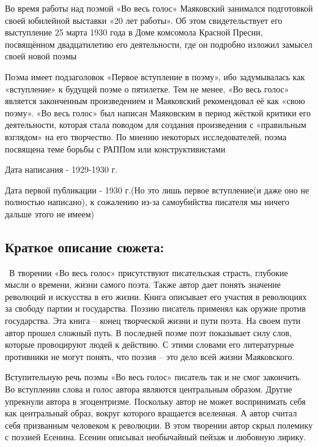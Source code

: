 \documentclass[a4paper,12pt]{article}
\begin{document}
	\noindent
	Во время работы над поэмой «Во весь голос» Маяковский занимался подготовкой своей юбилейной выставки «20 лет работы». Об этом свидетельствует его выступление 25 марта 1930 года в Доме комсомола Красной Пресни, посвящённом двадцатилетию его деятельности, где он подробно изложил замысел своей новой поэмы
	
	
	\noindent
	Поэма имеет подзаголовок «Первое вступление в поэму», ибо задумывалась как «вступление» к будущей поэме о пятилетке. Тем не менее, «Во весь голос» является законченным произведением и Маяковский рекомендовал её как «свою поэму». «Во весь голос» был написан Маяковским в период жёсткой критики его деятельности, которая стала поводом для создания произведения с «правильным взглядом» на его творчество. По мнению некоторых исследователей, поэма посвящена теме борьбы с РАППом или конструктивистами
	
	\noindent
	Дата написания - 1929-1930 г.
	
	\noindent
	Дата первой публикации - 1930 г.(Но это лишь первое вступление(и даже оно не полностью написано), к сожалению из-за самоубийства писателя мы ничего дальше этого не имеем)
	
	\subsection{Краткое описание сюжета: }
	\quad \, В творении «Во весь голос» присутствуют писательская страсть, глубокие мысли о времени, жизни самого поэта. Также автор дает понять значение революций и искусства в его жизни. Книга описывает его участия в революциях за свободу партии и государства. Поэзию писатель применял как оружие против государства. Эта книга – конец творческой жизни и пути поэта. На своем пути автор прошел сложный путь. В последней поэме поэт показывает силу слов, которые провоцируют людей к действию. С этими словами его литературные противники не могут понять, что поэзия – это дело всей жизни Маяковского.
	
	Вступительную речь поэмы «Во весь голос» писатель так и не смог закончить. Во вступлении слова и голос автора являются центральным образом. Другие упрекнули автора в эгоцентризме. Поскольку автор не может воспринимать себя как центральный образ, вокруг которого вращается вселенная. А автор считал себя призванным человеком к революции. В этом творении автор скрыл полемику с поэзией Есенина. Есенин описывал необычайный пейзаж и любовную лирику.
	
\end{document}
